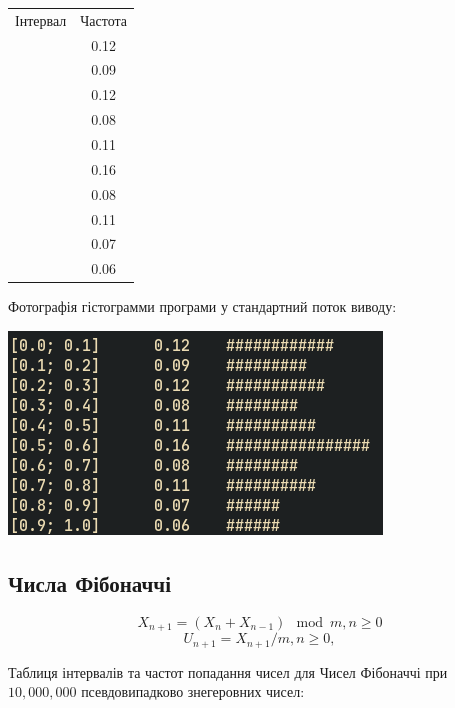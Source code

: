 \documentclass[a4paper,12pt]{report}
\begin{document}
\begin{table}[ht]
\centering %
\begin{tabular}{c c} %
  Інтервал & Частота \\\relax
  [0.0; 0.1] & 0.12 \\\relax
  [0.1; 0.2] & 0.09 \\\relax
  [0.2; 0.3] & 0.12 \\\relax
  [0.3; 0.4] & 0.08 \\\relax
  [0.4; 0.5] & 0.11 \\\relax
  [0.5; 0.6] & 0.16 \\\relax
  [0.6; 0.7] & 0.08 \\\relax
  [0.7; 0.8] & 0.11 \\\relax
  [0.8; 0.9] & 0.07 \\\relax
  [0.9; 1.0] & 0.06
\end{tabular}
\end{table}
Фотографія гістограмми програми у стандартний поток виводу:
\begin{center}\includegraphics[scale=0.5]{square}\end{center}


\subsection{Числа Фібоначчі}
\[X_{n+1}=(X_{n}  + X_{n-1})\mod m, n \ge 0\]
\[U_{n+1} = X_{n+1}/m, n\ge0, \]

Таблиця інтервалів та частот попадання чисел для Чисел Фібоначчі при $10,000,000$ псевдовипадково знегеровних чисел:
\end{document}
